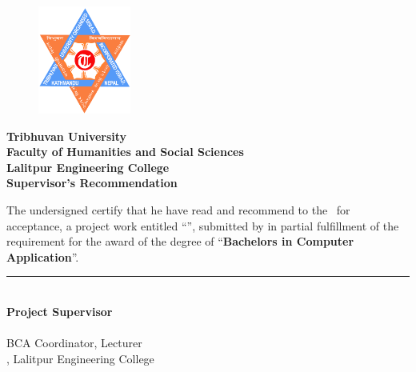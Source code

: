 

\begin{figure}
    \centering
    \includegraphics[width=1.2in]{img/Graphics/TUlogo.png}
\end{figure}
\begin{center}
    {\fontsize{14pt}{18}\selectfont
    \textbf{Tribhuvan University\\
    Faculty of Humanities and Social Sciences\\
    Lalitpur Engineering College\\
    \vspace{0.2in}
    Supervisor's Recommendation\\}}
\end{center}

\vspace{-0.5cm}
The undersigned certify that he have read and recommend to the \thedepartment \ for acceptance, a project work entitled “\textbf{\thetitle}”, submitted by \textbf{\authorWithAnd} in partial fulfillment of the requirement
for the award of the degree of “\textbf{Bachelors in Computer Application}”.

\vspace{1cm}
\rule{0.5\textwidth}{0.4pt}\\
\textbf{Project Supervisor}\\
\thesupervisor\\
BCA Coordinator, Lecturer\\
\thedepartment, Lalitpur Engineering College\\

\vspace{1cm}
\thedate
\restoregeometry
